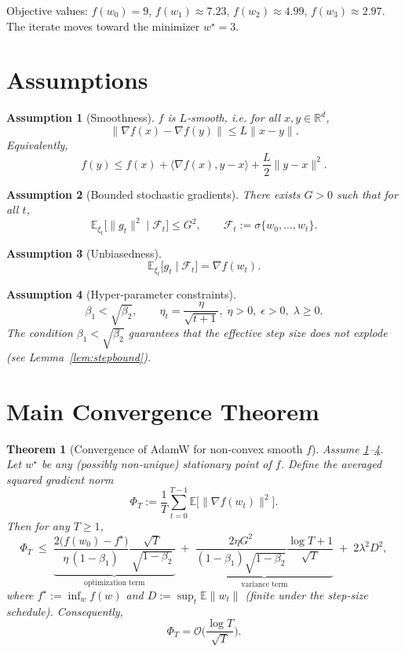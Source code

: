 \documentclass{article}
\newtheorem{theorem}{Theorem}
\newtheorem{assumption}{Assumption}
\begin{document}
Objective values: $f(w_0)=9$, $f(w_1)\approx 7.23$, $f(w_2)\approx 4.99$, $f(w_3)\approx 2.97$.  
The iterate moves toward the minimizer $w^\star=3$.

\section*{Assumptions}
\begin{assumption}[Smoothness]\label{ass:smooth}
$f$ is $L$‑smooth, i.e. for all $x,y\in\mathbb{R}^d$,
\[
\|\nabla f(x)-\nabla f(y)\|\le L\|x-y\|.
\]
Equivalently,
\[
f(y)\le f(x)+\langle\nabla f(x),y-x\rangle+\frac{L}{2}\|y-x\|^2 .
\tag{A1}
\]
\end{assumption}

\begin{assumption}[Bounded stochastic gradients]\label{ass:bounded}
There exists $G>0$ such that for all $t$,
\[
\mathbb{E}_{\xi_t}\big[\|g_t\|^2\mid\mathcal{F}_t\big]\le G^2,
\qquad 
\mathcal{F}_t:=\sigma\{w_0,\dots,w_t\}.
\tag{A2}
\]
\end{assumption}

\begin{assumption}[Unbiasedness]\label{ass:unbiased}
\[
\mathbb{E}_{\xi_t}\big[g_t\mid\mathcal{F}_t\big]=\nabla f(w_t).
\tag{A3}
\]
\end{assumption}

\begin{assumption}[Hyper‑parameter constraints]\label{ass:params}
\[
\beta_1<\sqrt{\beta_2},\qquad
\eta_t = \frac{\eta}{\sqrt{t+1}},\;
\eta>0,\;
\epsilon>0,\;
\lambda\ge 0.
\tag{A4}
\]
The condition $\beta_1<\sqrt{\beta_2}$ guarantees that the effective step size does not explode (see Lemma~\ref{lem:stepbound}).
\end{assumption}

\section*{Main Convergence Theorem}
\begin{theorem}[Convergence of AdamW for non‑convex smooth $f$]\label{thm:adamw}
Assume \ref{ass:smooth}–\ref{ass:params}. Let $w^\star$ be any (possibly non‑unique) stationary point of $f$.
Define the averaged squared gradient norm
\[
\Phi_T:=\frac{1}{T}\sum_{t=0}^{T-1}\mathbb{E}\big[\|\nabla f(w_t)\|^2\big].
\]
Then for any $T\ge 1$,
\[
\Phi_T\;\le\;
\underbrace{\frac{2\big(f(w_0)-f^\star\big)}{\eta\,(1-\beta_1)}\frac{\sqrt{T}}{\,\sqrt{1-\beta_2}\,}}_{\text{optimization term}}
\;+\;
\underbrace{\frac{2\eta G^2}{(1-\beta_1)\sqrt{1-\beta_2}}\frac{\log T+1}{\sqrt{T}}}_{\text{variance term}}
\;+\;
2\lambda^2 D^2,
\]
where $f^\star:=\inf_w f(w)$ and $D:=\sup_{t}\mathbb{E}\|w_t\|$ (finite under the step‑size schedule). Consequently,
\[
\Phi_T = \mathcal{O}\!\Big(\frac{\log T}{\sqrt{T}}\Big).
\]
\end{theorem}
\end{document}
